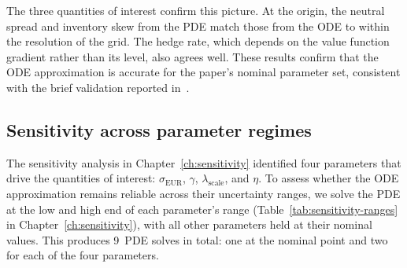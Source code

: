 The three quantities of interest confirm this picture. At the origin, the neutral spread and inventory skew from the PDE match those from the ODE to within the resolution of the grid. The hedge rate, which depends on the value function gradient rather than its level, also agrees well. These results confirm that the ODE approximation is accurate for the paper's nominal parameter set, consistent with the brief validation reported in~\cite{barzykin2023}.


\subsection{Sensitivity across parameter regimes}
\label{sec:pde-sensitivity}

The sensitivity analysis in Chapter~\ref{ch:sensitivity} identified four parameters that drive the quantities of interest: $\sigma_{\text{EUR}}$, $\gamma$, $\lambda_{\text{scale}}$, and $\eta$. To assess whether the ODE approximation remains reliable across their uncertainty ranges, we solve the PDE at the low and high end of each parameter's range (Table~\ref{tab:sensitivity-ranges} in Chapter~\ref{ch:sensitivity}), with all other parameters held at their nominal values. This produces 9~PDE solves in total: one at the nominal point and two for each of the four parameters.



